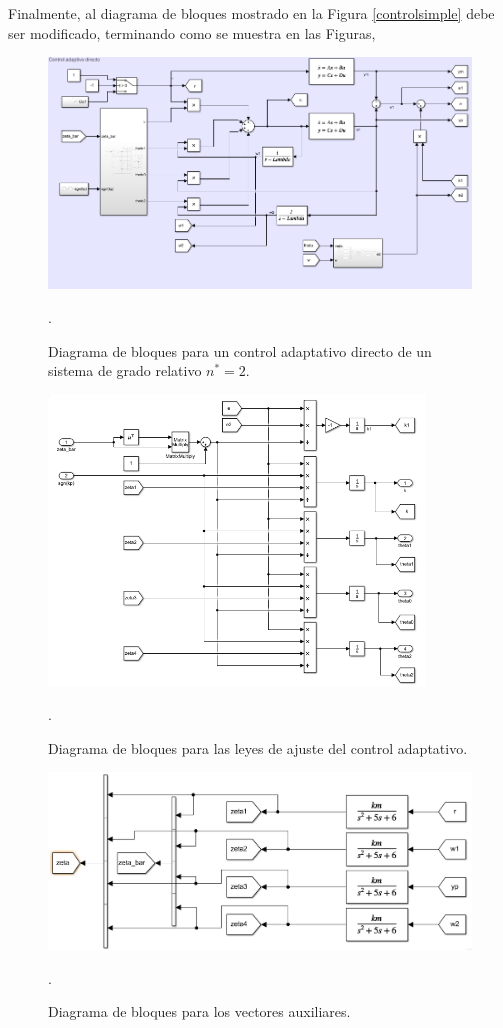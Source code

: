\documentclass[letterpaper,11pt]{article} %
\begin{document}
Finalmente, al diagrama de bloques mostrado en la Figura \ref{controlsimple} debe ser modificado, terminando como se muestra en las Figuras,
\begin{figure}
	\centering
	\captionsetup{justification=centering}
	\includegraphics[width=14cm]{control_real.png}
	\caption{Diagrama de bloques para un control adaptativo directo de un sistema de grado relativo $n^* = 2$.}
	\label{controlreal}.
\end{figure}
\begin{figure}
	\centering
	\captionsetup{justification=centering}
	\includegraphics[width=10cm]{leyesajuste.png}
	\caption{Diagrama de bloques para las leyes de ajuste del control adaptativo.}
	\label{leyesdeajuste}.
\end{figure}
\begin{figure}
	\centering
	\includegraphics[width=14cm]{vectorauxiliar.png}
	\caption{Diagrama de bloques para los vectores auxiliares.}
	\label{vectorauxiliar}.
\end{figure}
\end{document}

